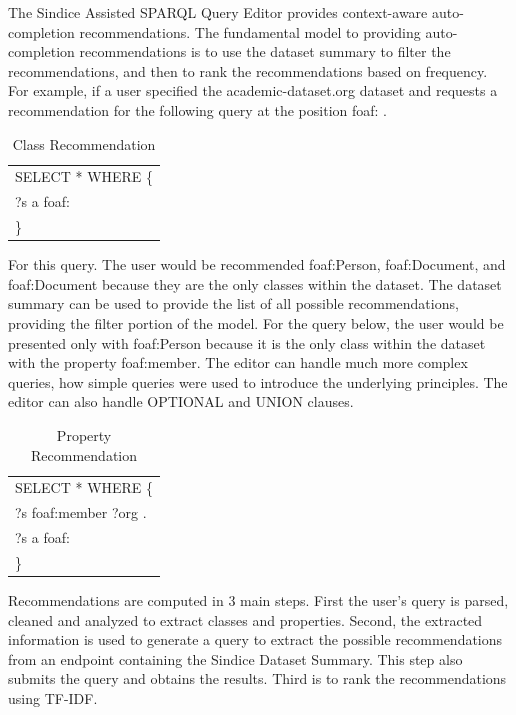 \documentclass[11pt,onecolumn]{article}
\newcommand{\tab}{\hspace*{2em}}
\begin{document}
The Sindice Assisted SPARQL Query Editor provides context-aware auto-completion recommendations.  The fundamental model to providing auto-completion recommendations is to use the dataset summary to filter the recommendations, and then to rank the recommendations based on frequency.  For example, if a user specified the academic-dataset.org dataset and requests a recommendation for the following query at the position foaf: .
\begin{table}[h!]
\begin{center}
  \begin{tabular}{| l | }
    \hline
    SELECT * WHERE \{\\  
    \tab ?s a foaf:\\ 
    \}    \\ \hline
  \end{tabular}
\end{center}
\caption{Class Recommendation}
\end{table}
For this query.  The user would be recommended foaf:Person, foaf:Document, and foaf:Document because they are the only classes within the dataset.  The dataset summary can be used to provide the list of all possible recommendations, providing the filter portion of the model.  For the query below, the user would be presented only with foaf:Person because it is the only class within the dataset with the property foaf:member.  The editor can handle much more complex queries, how simple queries were used to introduce the underlying principles.  The editor can also handle OPTIONAL and UNION clauses.

\begin{table}[h!]
\begin{center}
  \begin{tabular}{| l | }
    \hline
    SELECT * WHERE \{\\  
    \tab ?s foaf:member ?org .\\
    \tab ?s a foaf:\\ 
    \}    \\ \hline
  \end{tabular}
\end{center}
\caption{Property Recommendation}
\end{table}

Recommendations are computed in 3 main steps.  First the user's query is parsed, cleaned and analyzed to extract classes and properties.  Second, the extracted information is used to generate a query to extract the possible recommendations from an endpoint containing the Sindice Dataset Summary.  This step also submits the query and obtains the results.  Third is to rank the recommendations using TF-IDF.  
\end{document}
